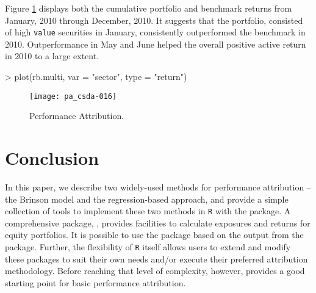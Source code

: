 Figure \ref{figure:regmultiattrib} displays both the cumulative
portfolio and benchmark returns from January, 2010 through December,
2010. It suggests that the portfolio, consisted of high \texttt{value}
securities in January, consistently outperformed the benchmark in
2010. Outperformance in May and June helped the overall positive
active return in 2010 to a large extent.
\begin{smallverbatim}
> plot(rb.multi, var = "sector", type = "return")
\end{smallverbatim}
\begin{figure}
\centering
\vspace*{.1in}
\texttt{[image: pa\_csda-016]}
\caption{\label{figure:regmultiattrib}
  Performance Attribution.}
\end{figure}
\section{Conclusion}

In this paper, we describe two widely-used methods for performance
attribution -- the Brinson model and the regression-based approach,
and provide a simple collection of tools to implement these two
methods in \texttt{R} with the  package.  A
comprehensive package,  \citet{kane:david}, provides
facilities to calculate exposures and returns for equity
portfolios. It is possible to use the  package based on the
output from the  package. Further, the flexibility
of \texttt{R} itself allows users to extend and modify these packages
to suit their own needs and/or execute their preferred attribution
methodology. Before reaching that level of complexity, however,
 provides a good starting point for basic performance
attribution.



